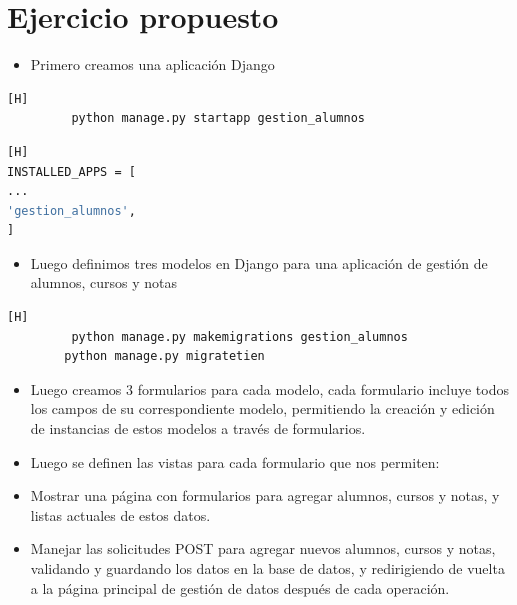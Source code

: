 \documentclass{article}
\begin{document}
\section{Ejercicio propuesto}
	\begin{itemize}
		\item Primero creamos una aplicación Django
	\end{itemize} 
	\begin{lstlisting}[language=bash,caption={Crear una aplicación Django}][H]
		 python manage.py startapp gestion_alumnos
	\end{lstlisting}
	\begin{lstlisting}[language=bash,caption={Agregar la aplicación al archivo settings.py del proyecto}][H]
INSTALLED_APPS = [
...
'gestion_alumnos',
]
	\end{lstlisting}
	\begin{itemize}
		\item Luego definimos tres modelos en Django para una aplicación de gestión de alumnos, cursos y notas
	\end{itemize} 
	
	\begin{lstlisting}[language=bash,caption={Crear y aplicar las migraciones}][H]
		 python manage.py makemigrations gestion_alumnos
		python manage.py migratetien
	\end{lstlisting}
	\begin{itemize}
		\item Luego creamos 3 formularios para cada modelo, cada formulario incluye todos los campos de su correspondiente modelo, permitiendo la creación y edición de instancias de estos modelos a través de formularios.
	\end{itemize} 
	
	\begin{itemize}
		\item Luego se definen las vistas para cada formulario que nos permiten:	
		\item Mostrar una página con formularios para agregar alumnos, cursos y notas, y listas actuales de estos datos.
		\item Manejar las solicitudes POST para agregar nuevos alumnos, cursos y notas, validando y guardando los datos en la base de datos, y redirigiendo de vuelta a la página principal de gestión de datos después de cada operación.
	\end{itemize} 
	
\end{document}
